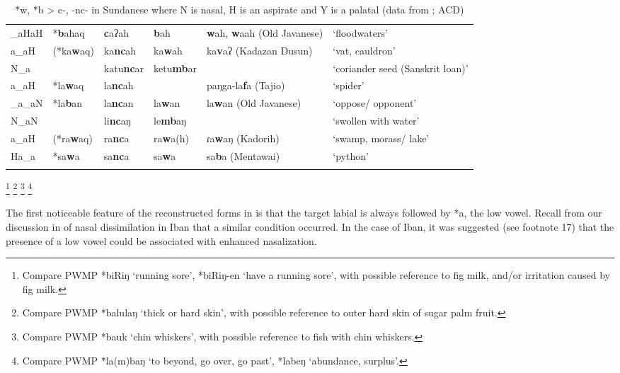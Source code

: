 \documentclass[output=paper]{langscibook}
\begin{document}
\begin{sidewaystable}
\begin{tabularx}{\textwidth}{llllll}
\_aHaH & *\textbf{b}ahaq & \textbf{c}aʔah & \textbf{b}ah & \textbf{w}ah, \textbf{w}aah  (Old Javanese) & ‘floodwaters’\\
a\_aH & (*ka\textbf{w}aq) & ka\textbf{nc}ah & ka\textbf{w}ah & ka\textbf{v}aʔ  (Kadazan Dusun) & ‘vat, cauldron’\\
N\_a &  & katu\textbf{nc}ar & ketu\textbf{mb}ar &  & ‘coriander seed (Sanskrit loan)’\\
a\_aH & *la\textbf{w}aq & la\textbf{nc}ah &  & paŋga-la\textbf{f}a  (Tajio) & ‘spider’\\
\_a\_aN & *la\textbf{b}an & la\textbf{nc}an & la\textbf{w}an & la\textbf{w}an (Old Javanese) & ‘oppose/ opponent’\\
N\_aN &  & li\textbf{nc}aŋ & le\textbf{mb}aŋ\footnotemark{} &  & ‘swollen with water’\\
a\_aH & (*ra\textbf{w}aq) & ra\textbf{nc}a & ra\textbf{w}a(h) & ɾa\textbf{w}aŋ (Kadorih) & ‘swamp, morass/ lake’\\
Ha\_a & *sa\textbf{w}a & sa\textbf{nc}a & sa\textbf{w}a & sa\textbf{b}a (Mentawai) & ‘python’\\
\lspbottomrule
\end{tabularx}

\footnote{ Compare PWMP *biRiŋ ‘running sore’, *biRiŋ-en ‘have a running sore’, with possible reference to fig milk, and/or irritation caused by fig milk.}
\footnote{ Compare PWMP *balulaŋ ‘thick or hard skin’, with possible reference to outer hard skin of sugar palm fruit.}
\footnote{ Compare PWMP *bauk ‘chin whiskers’, with possible reference to fish with chin whiskers.}
\footnote{Compare PWMP *la(m)baŋ ‘to beyond, go over, go past’, *labeŋ ‘abundance, surplus’.}

\caption{\label{tab:blevins:14} *w, *b > c-, -nc- in Sundanese where N is nasal, H is an aspirate and Y is a palatal (data from \citealt{Blust2005,Blust2018}; ACD)}
\end{sidewaystable}

The first noticeable feature of the reconstructed forms in  is that the target labial is always followed by *a, the low vowel. Recall from our discussion in  of nasal dissimilation in Iban that a similar condition occurred. In the case of Iban, it was suggested (see footnote 17) that the presence of a low vowel could be associated with enhanced nasalization.
\end{document}
